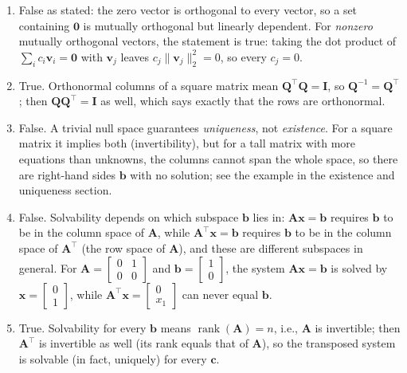 \begin{solution}
\begin{enumerate}[label=(\alphalphenum*)]
        \item False as stated: the zero vector is orthogonal to every vector, so a set containing $\mathbf{0}$ is mutually orthogonal but linearly dependent. For \emph{nonzero} mutually orthogonal vectors, the statement is true: taking the dot product of $\sum_i c_i \mathbf{v}_i = \mathbf{0}$ with $\mathbf{v}_j$ leaves $c_j \|\mathbf{v}_j\|_2^2 = 0$, so every $c_j = 0$.
        \item True. Orthonormal columns of a square matrix mean $\mathbf{Q}^\top\mathbf{Q} = \mathbf{I}$, so $\mathbf{Q}^{-1} = \mathbf{Q}^\top$; then $\mathbf{Q}\mathbf{Q}^\top = \mathbf{I}$ as well, which says exactly that the rows are orthonormal.
        \item False. A trivial null space guarantees \emph{uniqueness}, not \emph{existence}. For a square matrix it implies both (invertibility), but for a tall matrix with more equations than unknowns, the columns cannot span the whole space, so there are right-hand sides $\mathbf{b}$ with no solution; see the example in the existence and uniqueness section.
        \item False. Solvability depends on which subspace $\mathbf{b}$ lies in: $\mathbf{A}\mathbf{x}=\mathbf{b}$ requires $\mathbf{b}$ to be in the column space of $\mathbf{A}$, while $\mathbf{A}^\top\mathbf{x}=\mathbf{b}$ requires $\mathbf{b}$ to be in the column space of $\mathbf{A}^\top$ (the row space of $\mathbf{A}$), and these are different subspaces in general. For $\mathbf{A} = \begin{bmatrix} 0 & 1 \\ 0 & 0 \end{bmatrix}$ and $\mathbf{b} = \begin{bmatrix} 1 \\ 0 \end{bmatrix}$, the system $\mathbf{A}\mathbf{x}=\mathbf{b}$ is solved by $\mathbf{x} = \begin{bmatrix} 0 \\ 1 \end{bmatrix}$, while $\mathbf{A}^\top\mathbf{x} = \begin{bmatrix} 0 \\ x_1 \end{bmatrix}$ can never equal $\mathbf{b}$.
        \item True. Solvability for every $\mathbf{b}$ means $\operatorname{rank}(\mathbf{A}) = n$, i.e., $\mathbf{A}$ is invertible; then $\mathbf{A}^\top$ is invertible as well (its rank equals that of $\mathbf{A}$), so the transposed system is solvable (in fact, uniquely) for every $\mathbf{c}$.

\end{enumerate}
\end{solution}
